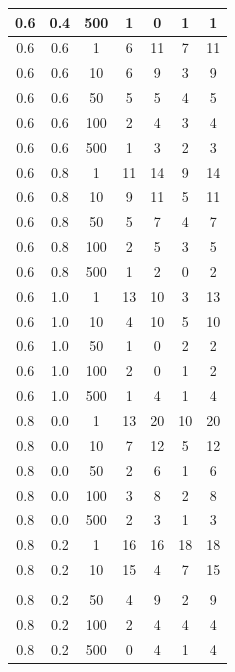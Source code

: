 \begin{longtable}{|c|c|c|c|c|c|c|}
	0.6 &  0.4 &  500 &     1 &     0 &     1 &     1 \\ \hline
	0.6 &  0.6 &    1 &     6 &    11 &     7 &    11 \\
	0.6 &  0.6 &   10 &     6 &     9 &     3 &     9 \\
	0.6 &  0.6 &   50 &     5 &     5 &     4 &     5 \\
	0.6 &  0.6 &  100 &     2 &     4 &     3 &     4 \\
	0.6 &  0.6 &  500 &     1 &     3 &     2 &     3 \\ \hline
	0.6 &  0.8 &    1 &    11 &    14 &     9 &    14 \\
	0.6 &  0.8 &   10 &     9 &    11 &     5 &    11 \\
	0.6 &  0.8 &   50 &     5 &     7 &     4 &     7 \\
	0.6 &  0.8 &  100 &     2 &     5 &     3 &     5 \\
	0.6 &  0.8 &  500 &     1 &     2 &     0 &     2 \\ \hline
	0.6 &  1.0 &    1 &    13 &    10 &     3 &    13 \\
	0.6 &  1.0 &   10 &     4 &    10 &     5 &    10 \\
	0.6 &  1.0 &   50 &     1 &     0 &     2 &     2 \\
	0.6 &  1.0 &  100 &     2 &     0 &     1 &     2 \\
	0.6 &  1.0 &  500 &     1 &     4 &     1 &     4 \\ \hline
	0.8 &  0.0 &    1 &    13 &    20 &    10 &    20 \\
	0.8 &  0.0 &   10 &     7 &    12 &     5 &    12 \\
	0.8 &  0.0 &   50 &     2 &     6 &     1 &     6 \\
	0.8 &  0.0 &  100 &     3 &     8 &     2 &     8 \\
	0.8 &  0.0 &  500 &     2 &     3 &     1 &     3 \\ \hline
	0.8 &  0.2 &    1 &    16 &    16 &    18 &    18 \\ 
	0.8 &  0.2 &   10 &    15 &     4 &     7 &    15 \\
	\hline
	\pagebreak
	\multicolumn{7}{l}{\textit{Продолжение таблицы}}\\
	\hline
	0.8 &  0.2 &   50 &     4 &     9 &     2 &     9 \\
	0.8 &  0.2 &  100 &     2 &     4 &     4 &     4 \\
	0.8 &  0.2 &  500 &     0 &     4 &     1 &     4 \\ \hline

\end{longtable}
